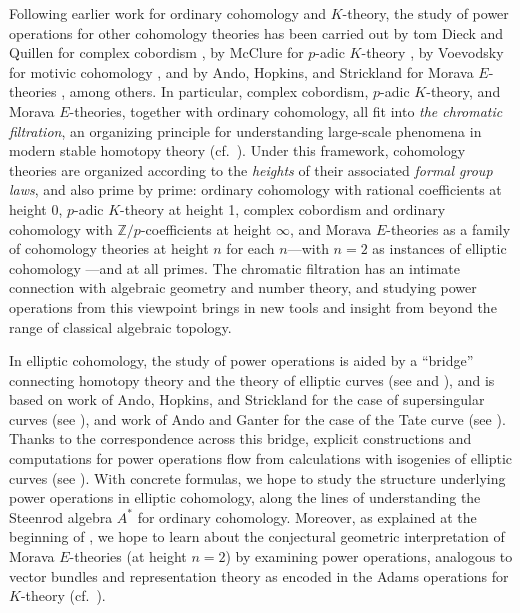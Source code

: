 \documentclass{rs}
\theoremstyle{definition}
\theoremstyle{remark}
\newcommand{\mb}[1]{\mathbb{#1}}
\newcommand{\BZ}{{\mb Z}}
\begin{document}
Following earlier work for ordinary cohomology and $K$-theory, 
the study of power operations for other cohomology theories has been carried out 
by tom Dieck and Quillen for complex cobordism \cite{tomdieck, quillenmu}, 
by McClure for $p$-adic $K$-theory \cite{mcclure, H_infty}, 
by Voevodsky for motivic cohomology \cite{V}, 
and by Ando, Hopkins, and Strickland for Morava $E$-theories \cite{AHS04}, among others.  
In particular, complex cobordism, $p$-adic $K$-theory, and Morava $E$-theories, together with ordinary cohomology, 
all fit into {\em the chromatic filtration}, 
an organizing principle for understanding large-scale phenomena in modern stable homotopy theory (cf.~\cite{quillenfgl, orange, tafoverview}).  
Under this framework, cohomology theories are organized according to the {\em heights} of their associated {\em formal group laws}, and also prime by prime: 
ordinary cohomology with rational coefficients at height 0, 
$p$-adic $K$-theory at height 1, complex cobordism and ordinary cohomology with $\BZ/p$-coefficients at height $\infty$, 
and Morava $E$-theories as a family of cohomology theories at height $n$ for each $n$---with $n = 2$ as instances of elliptic cohomology 
\cite{morava, hopkinsmahowald, survey}---and at all primes.  
The chromatic filtration has an intimate connection with algebraic geometry and number theory, 
and studying power operations from this viewpoint brings in new tools and insight from beyond the range of classical algebraic topology.  

In elliptic cohomology, the study of power operations is aided by 
a ``bridge'' connecting homotopy theory and the theory of elliptic curves (see \cite[Theorem B]{cong} and \cite[Theorem 2.9.1]{KM}), 
and is based on work of Ando, Hopkins, and Strickland for the case of supersingular curves (see \cite{AHS04}), 
and work of Ando and Ganter for the case of the Tate curve (see \cite{andotrans, ganterTate}).  
Thanks to the correspondence across this bridge, 
explicit constructions and computations for power operations flow from calculations with isogenies of elliptic curves (see \cite{h2p2}).  
With concrete formulas, we hope to study the structure underlying power operations in elliptic cohomology, 
along the lines of understanding the Steenrod algebra $A^*$ for ordinary cohomology.  
Moreover, as explained at the beginning of \cite{andoduke}, 
we hope to learn about the conjectural geometric interpretation of Morava $E$-theories (at height $n = 2$) by examining power operations, 
analogous to vector bundles and representation theory as encoded in the Adams operations for $K$-theory (cf.~\cite{adamsvector, atiyah}).  
\end{document}

